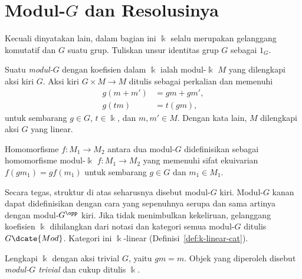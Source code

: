 \section{Modul-\texorpdfstring{$G$}{G} dan Resolusinya}\label{sec:G-mod}

Kecuali dinyatakan lain, dalam bagian ini $\Bbbk$ selalu merupakan gelanggang
komutatif dan $G$ suatu grup. Tuliskan unsur identitas grup $G$ sebagai $1_G$.

\begin{definisi}\label{def:G-mod}
	Suatu \emph{modul-$G$} dengan koefisien dalam $\Bbbk$ ialah modul-$\Bbbk$
	$M$ yang dilengkapi aksi kiri $G$. Aksi kiri $G\times M\to M$ ditulis
	sebagai perkalian dan memenuhi
	\begin{align*}
		g(m + m') & = gm + gm', \\
		g(tm) & = t(gm),
	\end{align*}
	untuk sembarang $g\in G$, $t\in\Bbbk$, dan $m,m'\in M$. Dengan kata lain,
	$M$ dilengkapi aksi $G$ yang linear.

	Homomorfisme $f:M_1\to M_2$ antara dua modul-$G$ didefinisikan sebagai
	homomorfisme modul-$\Bbbk$ $f:M_1\to M_2$ yang memenuhi sifat ekuivarian
	$f(gm_1)=gf(m_1)$ untuk sembarang $g\in G$ dan $m_1\in M_1$.
\end{definisi}

Secara tegas, struktur di atas seharusnya disebut modul-$G$ kiri. Modul-$G$
kanan dapat didefinisikan dengan cara yang sepenuhnya serupa dan sama artinya
dengan modul-$G^{\opp}$ kiri. Jika tidak menimbulkan kekeliruan, gelanggang
koefisien $\Bbbk$ dihilangkan dari notasi dan kategori semua modul-$G$ ditulis
$G\dcate{Mod}$. Kategori ini $\Bbbk$-linear
(Definisi~\ref{def:k-linear-cat}).

\begin{contoh}\label{eg:trivial-G-mod}
	Lengkapi $\Bbbk$ dengan aksi trivial $G$, yaitu $gm=m$. Objek yang diperoleh
	disebut \emph{modul-$G$ trivial} dan cukup ditulis $\Bbbk$.
\end{contoh}

